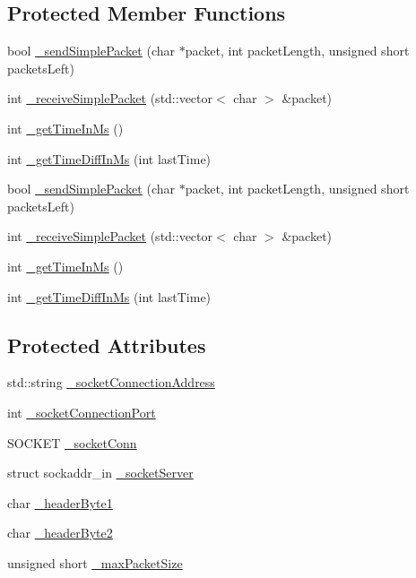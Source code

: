 \subsection*{Protected Member Functions}
\begin{DoxyCompactItemize}
\item 
bool \hyperlink{classCSocketOutConnection_aecd4ed7366fe4d26b7aee7c40f2cb149}{\+\_\+send\+Simple\+Packet} (char $\ast$packet, int packet\+Length, unsigned short packets\+Left)
\item 
int \hyperlink{classCSocketOutConnection_a8fe9c6ffe547417d37baa5737dcc6596}{\+\_\+receive\+Simple\+Packet} (std\+::vector$<$ char $>$ \&packet)
\item 
int \hyperlink{classCSocketOutConnection_a48ea2d2223cb127fa3e856f9202400ec}{\+\_\+get\+Time\+In\+Ms} ()
\item 
int \hyperlink{classCSocketOutConnection_a975e026eda1a75091bc618f007f20809}{\+\_\+get\+Time\+Diff\+In\+Ms} (int last\+Time)
\item 
bool \hyperlink{classCSocketOutConnection_aecd4ed7366fe4d26b7aee7c40f2cb149}{\+\_\+send\+Simple\+Packet} (char $\ast$packet, int packet\+Length, unsigned short packets\+Left)
\item 
int \hyperlink{classCSocketOutConnection_a8fe9c6ffe547417d37baa5737dcc6596}{\+\_\+receive\+Simple\+Packet} (std\+::vector$<$ char $>$ \&packet)
\item 
int \hyperlink{classCSocketOutConnection_a48ea2d2223cb127fa3e856f9202400ec}{\+\_\+get\+Time\+In\+Ms} ()
\item 
int \hyperlink{classCSocketOutConnection_a975e026eda1a75091bc618f007f20809}{\+\_\+get\+Time\+Diff\+In\+Ms} (int last\+Time)
\end{DoxyCompactItemize}
\subsection*{Protected Attributes}
\begin{DoxyCompactItemize}
\item 
std\+::string \hyperlink{classCSocketOutConnection_a84876c61143ce6ebf83082824ca1d232}{\+\_\+socket\+Connection\+Address}
\item 
int \hyperlink{classCSocketOutConnection_a760902b8101aca205a3556020bc7bc50}{\+\_\+socket\+Connection\+Port}
\item 
S\+O\+C\+K\+ET \hyperlink{classCSocketOutConnection_a99dd605a5c9c6f635038213610447ac8}{\+\_\+socket\+Conn}
\item 
struct sockaddr\+\_\+in \hyperlink{classCSocketOutConnection_a7a4a2efbc8fced507bd76b88c2725af3}{\+\_\+socket\+Server}
\item 
char \hyperlink{classCSocketOutConnection_a35064c765760c0088efc66089090bf2c}{\+\_\+header\+Byte1}
\item 
char \hyperlink{classCSocketOutConnection_a47f6cf4d96b6a829190e37067c6e17f0}{\+\_\+header\+Byte2}
\item 
unsigned short \hyperlink{classCSocketOutConnection_a4df79b453417a21cd75b94d639410501}{\+\_\+max\+Packet\+Size}
\end{DoxyCompactItemize}


